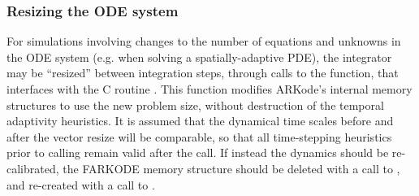 \documentclass[letterpaper,10pt,english]{sphinxmanual}
\begin{document}
\subsubsection{Resizing the ODE system}
\label{f_interface/Usage:finterface-resize}\label{f_interface/Usage:resizing-the-ode-system}
For simulations involving changes to the number of equations and
unknowns in the ODE system (e.g. when solving a spatially-adaptive
PDE), the {\hyperref[f_interface/Usage:f/_/FARKODE]{\emph{}}} integrator may be ``resized'' between
integration steps, through calls to the {\hyperref[f_interface/Usage:f/_/FARKRESIZE]{\emph{}}}
function, that interfaces with the C routine {\hyperref[c_interface/User_callable:c.ARKodeResize]{\emph{}}}.
This function modifies ARKode's internal memory structures to use the
new problem size, without destruction of the temporal adaptivity
heuristics.  It is assumed that the dynamical time scales before and
after the vector resize will be comparable, so that all time-stepping
heuristics prior to calling  remain valid after
the call.  If instead the dynamics should be re-calibrated, the
FARKODE memory structure should be deleted with a call to
{\hyperref[f_interface/Usage:f/_/FARKFREE]{\emph{}}}, and re-created with a call to
{\hyperref[f_interface/Usage:f/_/FARKMALLOC]{\emph{}}}.
\end{document}

